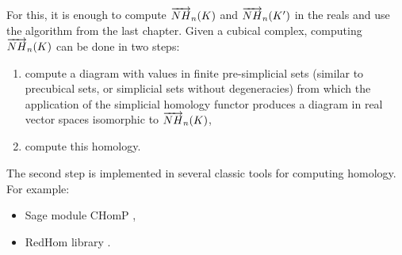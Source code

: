 	For this, it is enough to compute $\overrightarrow{NH}_{n}(K)$ and $\overrightarrow{NH}_{n}(K')$ in the reals and use the algorithm from the last chapter. Given a cubical complex, computing $\overrightarrow{NH}_{n}(K)$ can be done in two steps:
	\begin{enumerate}
		\item compute a diagram with values in finite pre-simplicial sets (similar to precubical sets, or simplicial sets without degeneracies) from which the application of the simplicial homology functor produces a diagram in real vector spaces isomorphic to $\overrightarrow{NH}_{n}(K)$,
		\item compute this homology.
	\end{enumerate}
	
	The second step is implemented in several classic tools for computing homology. For example:
	\begin{itemize}
		\item Sage module CHomP \cite{chomp},
		\item RedHom library \cite{redhom}.
	\end{itemize}
	
